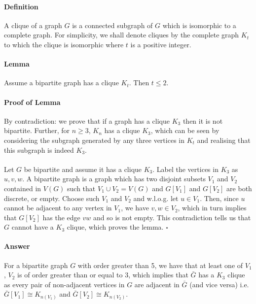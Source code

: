 \paragraph{Definition} A clique of a graph $G$ is a connected subgraph of $G$ which is
isomorphic to a complete graph. For simplicity, we shall denote cliques by the
complete graph $K_t$ to which the clique is isomorphic where $t$ is a positive integer.
\paragraph{Lemma} Assume a bipartite graph has a clique $K_t$. Then $t \leq 2$.
\paragraph{Proof of Lemma} By contradiction: we prove that if a graph has a clique
$K_3$ then it is not bipartite. Further, for $n \geq 3$, $K_n$ has a clique $K_3$, which can
be seen by considering the subgraph generated by any three vertices in $K_t$ and
realising that this subgraph is indeed $K_3$.
\paragraph{} Let $G$ be bipartite and assume it has a clique $K_3$. Label the vertices in $K_3$
as $u,v,w$. A bipartite graph is a graph which has two disjoint subsets $V_1$ and
$V_2$ contained in $V\left(G\right)$ such that $V_1 \cup V_2 = V\left(G\right)$ and $G\left[V_1\right]$ and $G\left[V_2\right]$ are
both discrete, or empty. Choose such $V_1$ and $V_2$ and w.l.o.g. let $u \in V_1$. Then, since $u$ 
cannot be adjacent to any vertex in $V_1$, we have $v,w \in V_2$, which in turn 
implies that $G\left[V_2\right]$ has the edge $vw$ and so is not empty. This contradiction
tells us that $G$ cannot have a $K_3$ clique, which proves the lemma.
$\square$
\paragraph{Answer}For a bipartite graph $G$ with order greater than 5, we have that at
least one of $V_1$, $V_2$ is of order greater than or equal to 3, which implies that $\bar{G}$
has a $K_3$ clique as every pair of non-adjacent vertices in $G$ are adjacent in $\bar{G}$ (and vice
versa) i.e. $\bar{G}\left[V_1\right] \cong K_{n\left(V_1\right)}$ and $\bar{G}\left[V_2\right] \cong K_{n\left(V_2\right)}$.
